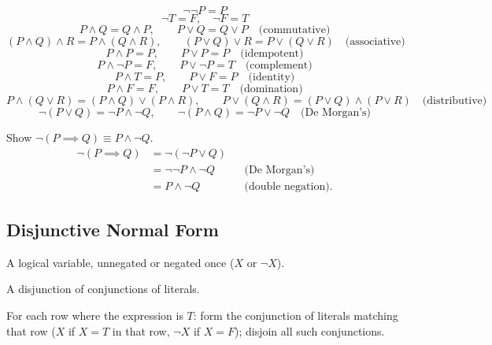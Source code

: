\begin{note}
\[
\neg\neg P = P
\]
\[
\neg T = F, \quad \neg F = T
\]
\[
P\wedge Q = Q\wedge P, \qquad P\vee Q = Q\vee P \quad \text{(commutative)}
\]
\[
(P\wedge Q)\wedge R = P\wedge(Q\wedge R), \qquad (P\vee Q)\vee R = P\vee(Q\vee R) \quad \text{(associative)}
\]
\[
P\wedge P = P, \qquad P\vee P = P \quad \text{(idempotent)}
\]
\[
P\wedge\neg P = F, \qquad P\vee\neg P = T \quad \text{(complement)}
\]
\[
P\wedge T = P, \qquad P\vee F = P \quad \text{(identity)}
\]
\[
P\wedge F = F, \qquad P\vee T = T \quad \text{(domination)}
\]
\[
P\wedge(Q\vee R)=(P\wedge Q)\vee(P\wedge R), \qquad P\vee(Q\wedge R)=(P\vee Q)\wedge(P\vee R) \quad \text{(distributive)}
\]
\[
\neg(P\vee Q)=\neg P\wedge\neg Q, \qquad \neg(P\wedge Q)=\neg P\vee\neg Q \quad \text{(De Morgan's)}
\]
\end{note}

\bigskip
\begin{example}
Show $\neg(P\implies Q) \equiv P \wedge \neg Q$.
\begin{align*}
\neg(P\implies Q) &= \neg(\neg P \vee Q) \\
&= \neg\neg P \wedge \neg Q && \text{(De Morgan's)}\\
&= P \wedge \neg Q && \text{(double negation)}.
\end{align*}
\end{example}

\subsection{Disjunctive Normal Form}
\label{sec:4-16}

\begin{definition}[Literal]
A logical variable, unnegated or negated once ($X$ or $\neg X$).
\end{definition}

\begin{definition}[DNF]
A disjunction of conjunctions of literals.
\end{definition}

\begin{note}
For each row where the expression is $T$: form the conjunction of literals matching that row ($X$ if $X=T$ in that row, $\neg X$ if $X=F$); disjoin all such conjunctions.
\end{note}

